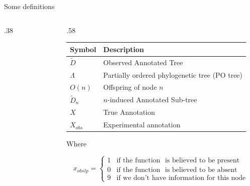 \documentclass[9pt,ignorenonframetext,]{beamer}
\newcommand{\includetikz}[2]{
\begin{figure}
\scalebox{#2}{

}
\end{figure}
}
\newcommand{\phylo}{\Lambda{}} %
\newcommand{\aphylo}{D{}}      %
\newcommand{\aphyloObs}{\tilde \aphylo{}} %
\newcommand{\Ann}{X{}} %
\newcommand{\AnnObs}{{X_{obs}}{}}%
\newcommand{\annObs}{{x_{obs}}{}}%
\def\begincols{\begin{columns}[T]}
\def\begincol{\begin{column}[T]}
\def\endcol{\end{column}}
\def\endcols{\end{columns}}
\begin{document}
\begin{frame}[t,label=definitions]{Some definitions}

\begincols

\begincol{.38\linewidth}

\includetikz{simple_tree_names.tex}{.5}

\endcol

\begincol{.58\linewidth}

\footnotesize

\begin{longtable}[]{@{}ll@{}}
\toprule
Symbol & Description\tabularnewline
\midrule
\endhead
\(\aphyloObs\) & Observed Annotated Tree\tabularnewline
\(\phylo\) & Partially ordered phylogenetic tree (PO
tree)\tabularnewline
\(O(n)\) & Offspring of node \(n\)\tabularnewline
\(\aphyloObs_n\) & \(n\)-induced Annotated Sub-tree\tabularnewline
\(\Ann\) & True Annotation\tabularnewline
\(\AnnObs\) & Experimental annotation\tabularnewline
\bottomrule
\end{longtable}

Where

\[
\annObs_{lp} = \left\{
\begin{array}{ll}
1 & \mbox{if the function }\mbox{ is believed to be present}\\
0 & \mbox{if the function }\mbox{ is believed to be absent}\\
9 & \mbox{if we don't have information for this node }
\end{array}\right.
\]

\normalsize

\hyperlink{formaldef}{}

\endcol

\endcols

\end{frame}
\end{document}
